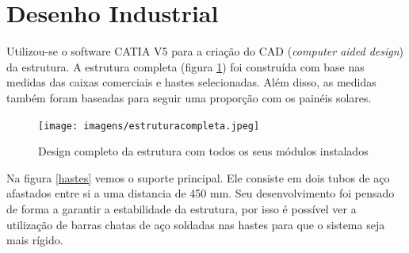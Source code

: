 \section{Desenho Industrial}

Utilizou-se o software CATIA V5 para a criação do CAD (\textit{computer aided design}) da estrutura. A estrutura completa (figura \ref{estrucomp}) foi construída com base nas medidas das caixas comerciais e hastes selecionadas. Além disso, as medidas também foram baseadas para seguir uma proporção com os painéis solares. 

\begin{figure}[H]
	\centering
    \texttt{[image: imagens/estruturacompleta.jpeg]}
    \caption{Design completo da estrutura com todos os seus módulos instalados}
    \label{estrucomp}
\end{figure}

Na figura \ref{hastes} vemos o suporte principal. Ele consiste em dois tubos de aço afastados entre si a uma distancia de 450 mm. Seu desenvolvimento foi pensado de forma a garantir a estabilidade da estrutura, por isso é possível ver a utilização de barras chatas de aço soldadas nas hastes para que o sistema seja mais rígido.

